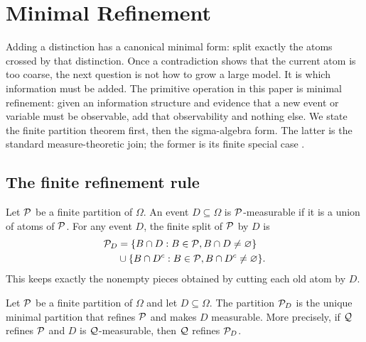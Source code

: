 \section{Minimal Refinement}
\label{sec:minimal-refinement}

Adding a distinction has a canonical minimal form: split exactly the atoms crossed by that distinction. Once a contradiction shows that the current atom is too coarse, the next question is not how to grow a large model. It is which information must be added. The primitive operation in this paper is minimal refinement: given an information structure and evidence that a new event or variable must be observable, add that observability and nothing else. We state the finite partition theorem first, then the sigma-algebra form. The latter is the standard measure-theoretic join; the former is its finite special case \citep{billingsley1995probability,kallenberg2002foundations}.

\subsection{The finite refinement rule}

\begin{definition}
\label{def:partition-measurable-event}
Let $\mathcal{P}$ be a finite partition of $\Omega$. An event $D\subseteq\Omega$ is $\mathcal{P}$-measurable if it is a union of atoms of $\mathcal{P}$. For any event $D$, the finite split of $\mathcal{P}$ by $D$ is
\begin{align*}
\mathcal{P}_D
&=\{B\cap D:B\in\mathcal{P}, B\cap D\ne\varnothing\}\\
&{}\cup\{B\cap D^c:B\in\mathcal{P}, B\cap D^c\ne\varnothing\}.
\end{align*}
This keeps exactly the nonempty pieces obtained by cutting each old atom by $D$.
\end{definition}

\begin{theorem}
\label{thm:minimal-refinement:informal}
Let $\mathcal{P}$ be a finite partition of $\Omega$ and let $D\subseteq\Omega$. The partition $\mathcal{P}_D$ is the unique minimal partition that refines $\mathcal{P}$ and makes $D$ measurable. More precisely, if $\mathcal{Q}$ refines $\mathcal{P}$ and $D$ is $\mathcal{Q}$-measurable, then $\mathcal{Q}$ refines $\mathcal{P}_D$.
\end{theorem}

